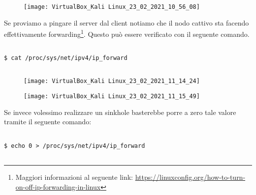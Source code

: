 \documentclass[14pt]{extreport}
\begin{document}
\begin{figure}[H]
\centering
\texttt{[image: VirtualBox\_Kali Linux\_23\_02\_2021\_10\_56\_08]}
\end{figure}



Se proviamo a pingare il server dal client notiamo che il nodo cattivo sta facendo effettivamente forwarding\footnote{Maggiori informazioni al seguente link: \url{https://linuxconfig.org/how-to-turn-on-off-ip-forwarding-in-linux}}. Questo può essere verificato con il seguente comando.

\vspace{5pt}

{
\small
\begin{tcolorbox}

\begin{verbatim}

$ cat /proc/sys/net/ipv4/ip_forward
  
\end{verbatim}

\end{tcolorbox}
}

\vspace{5pt}


\begin{figure}[H]
\centering
\texttt{[image: VirtualBox\_Kali Linux\_23\_02\_2021\_11\_14\_24]}
\end{figure}

\begin{figure}[H]
\centering
\texttt{[image: VirtualBox\_Kali Linux\_23\_02\_2021\_11\_15\_49]}
\end{figure}












Se invece volessimo realizzare un sinkhole basterebbe porre a zero tale valore tramite il seguente comando:

\vspace{5pt}

{
\small
\begin{tcolorbox}

\begin{verbatim}

$ echo 0 > /proc/sys/net/ipv4/ip_forward
  
\end{verbatim}

\end{tcolorbox}
}
\end{document}
